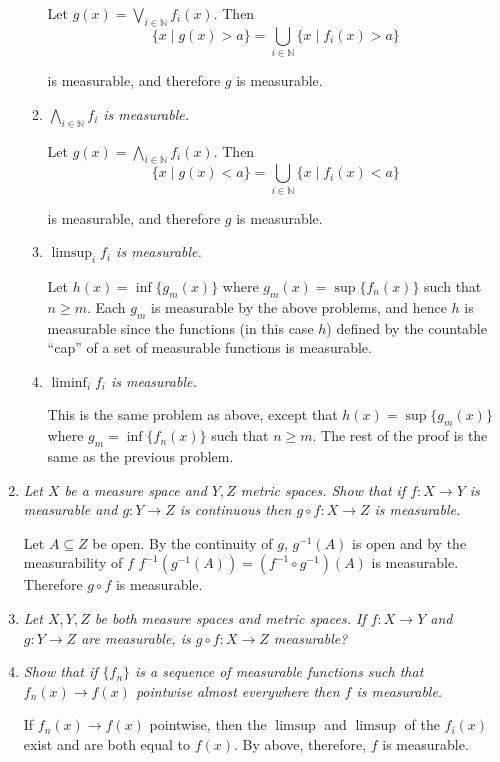 \documentclass[11pt]{article}
\newcommand{\N}{\mathbb{N}}
\begin{document}
\begin{enumerate}
\begin{enumerate}
Let $g(x) = \bigvee_{i \in \N} f_i(x)$.  Then
\[
\{x \mid g(x) > a\} = \bigcup_{i \in \N} \{x \mid f_i(x) > a\}
\]

is measurable, and therefore $g$ is measurable.

\item \emph{$\bigwedge_{i \in \N} f_i$ is measurable.}

Let $g(x) = \bigwedge_{i \in \N} f_i(x)$.  Then
\[
\{x \mid g(x) < a\} = \bigcup_{i \in \N} \{x \mid f_i(x) < a\}
\]

is measurable, and therefore $g$ is measurable.

\item \emph{$\limsup_{i} f_i$ is measurable.}

Let $h(x) = \inf\{g_m(x)\}$ where $g_m(x) = \sup\{f_n(x)\}$ such that $n \geq m$.  Each $g_m$ is measurable by the above problems, and hence $h$ is measurable since the functions (in this case $h$) defined by the countable ``cap'' of a set of measurable functions is measurable.

\item \emph{$\liminf_{i} f_i$ is measurable.}

This is the same problem as above, except that $h(x) = \sup\{g_m(x)\}$ where $g_m = \inf\{f_n(x)\}$ such that $n \geq m$.  The rest of the proof is the same as the previous problem.
\end{enumerate}

\item \emph{Let $X$ be a measure space and $Y,Z$ metric spaces.  Show that if $f: X \rightarrow Y$ is measurable and $g: Y \rightarrow Z$ is continuous then $g \circ f: X \rightarrow Z$ is measurable.}

Let $A \subseteq Z$ be open.  By the continuity of $g$, $g^{-1}(A)$ is open and by the measurability of $f$ $f^{-1}(g^{-1}(A)) = (f^{-1} \circ g^{-1})(A)$ is measurable.  Therefore $g \circ f$ is measurable.

\item \emph{Let $X,Y,Z$ be both measure spaces and metric spaces.  If $f:X \rightarrow Y$ and $g:Y \rightarrow Z$ are measurable, is $g \circ f: X \rightarrow Z$ measurable?}

\item \emph{Show that if $\{f_n\}$ is a sequence of measurable functions such that $f_n(x) \rightarrow f(x)$ pointwise almost everywhere then $f$ is measurable.}

If $f_n(x) \rightarrow f(x)$ pointwise, then the $\limsup$ and $\limsup$ of the $f_i(x)$ exist and are both equal to $f(x)$.  By above, therefore, $f$ is measurable.


\end{enumerate}
\end{document}
